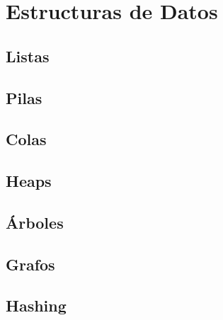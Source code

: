 \documentclass[titlepage,oneside]{book}
\begin{document}
\part{Estructuras de Datos}
\chapter{Listas}

\chapter{Pilas}

\chapter{Colas}

\chapter{Heaps}

\chapter{Árboles}

\chapter{Grafos}

\chapter{Hashing}

\printbibliography{}
\end{document}
